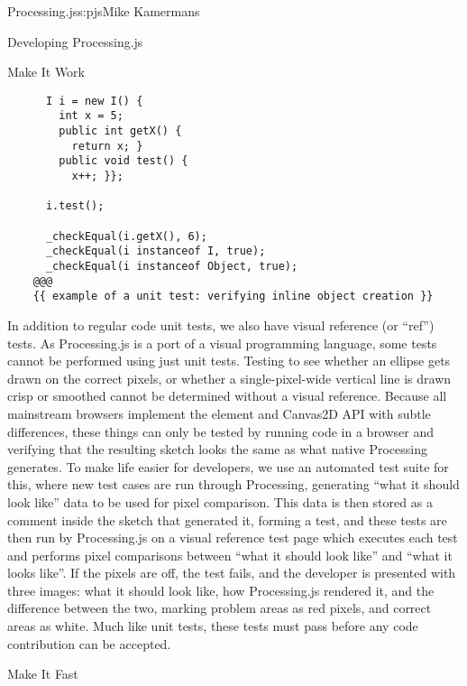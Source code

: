 \begin{aosachapter}{Processing.js}{s:pjs}{Mike Kamermans}
\begin{aosasect1}{Developing Processing.js}
\begin{aosasect2}{Make It Work}
\begin{verbatim}
      I i = new I() {
        int x = 5;
        public int getX() {
          return x; }
        public void test() {
          x++; }};

      i.test();

      _checkEqual(i.getX(), 6);
      _checkEqual(i instanceof I, true);
      _checkEqual(i instanceof Object, true);
    @@@
    {{ example of a unit test: verifying inline object creation }}
\end{verbatim}

In addition to regular code unit tests, we also have visual reference
(or ``ref'') tests. As Processing.js is a port of a visual programming
language, some tests cannot be performed using just unit
tests. Testing to see whether an ellipse gets drawn on the correct
pixels, or whether a single-pixel-wide vertical line is drawn crisp or
smoothed cannot be determined without a visual reference. Because all
mainstream browsers implement the
 element and Canvas2D API with
subtle differences, these things can only be tested by running code in
a browser and verifying that the resulting sketch looks the same as
what native Processing generates. To make life easier for developers,
we use an automated test suite for this, where new test cases are run
through Processing, generating ``what it should look like'' data to be
used for pixel comparison. This data is then stored as a comment
inside the sketch that generated it, forming a test, and these tests
are then run by Processing.js on a visual reference test page which
executes each test and performs pixel comparisons between ``what it
should look like'' and ``what it looks like''. If the pixels are off, the
test fails, and the developer is presented with three images:
what it should look like, how Processing.js
rendered it, and the difference between the two, marking
problem areas as red pixels, and correct areas as white. Much like
unit tests, these tests must pass before any code contribution can be
accepted.

\end{aosasect2}

\begin{aosasect2}{Make It Fast}


\end{aosasect2}
\end{aosasect1}
\end{aosachapter}
